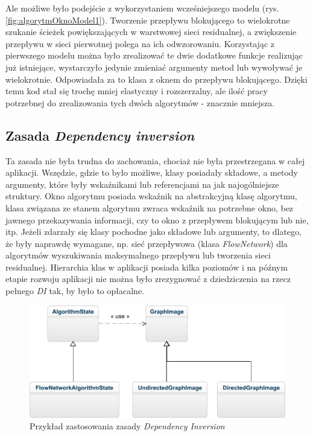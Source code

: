 Ale możliwe było podejście z wykorzystaniem wcześniejszego modelu (rys. \ref{fig:algorytmOknoModel1}). Tworzenie przepływu blokującego to wielokrotne szukanie ścieżek powiększających w warstwowej sieci residualnej, a zwiększenie przepływu w sieci pierwotnej polega na ich odwzorowaniu. Korzystając z pierwszego modelu można było zrealizować te dwie dodatkowe funkcje realizując już istniejące, wystarczyło jedynie zmieniać argumenty metod lub wywoływać je wielokrotnie. Odpowiadała za to klasa z oknem do przepływu blokującego. Dzięki temu kod stał się trochę mniej elastyczny i rozszerzalny, ale ilość pracy potrzebnej do zrealizowania tych dwóch algorytmów - znacznie mniejsza.
\subsection{Zasada \textit{Dependency inversion}}
Ta zasada nie była trudna do zachowania, chociaż nie była przestrzegana w całej aplikacji. Wszędzie, gdzie to było możliwe, klasy posiadały składowe, a metody argumenty, które były wskaźnikami lub referencjami na jak najogólniejsze struktury. Okno algorytmu posiada wskaźnik na abstrakcyjną klasę algorytmu, klasa związana ze stanem algorytmu zwraca wskaźnik na potrzebne okno, bez jawnego przekazywania informacji, czy to okno z przepływem blokującym lub nie, itp. Jeżeli zdarzały się klasy pochodne jako składowe lub argumenty, to dlatego, że były naprawdę wymagane, np. sieć przepływowa (klasa \emph{FlowNetwork}) dla algorytmów wyszukiwania maksymalnego przepływu lub tworzenia sieci residualnej. Hierarchia klas w aplikacji posiada kilka poziomów i na późnym etapie rozwoju aplikacji nie można było zrezygnować z dziedziczenia na rzecz pełnego \emph{DI} tak, by było to opłacalne.
\begin{figure}[H]
	\centering
	\includegraphics[width=0.8\linewidth]{./img/SOLD_DI.pdf}
	\caption{Przykład zastosowania zasady \textit{Dependency Inversion}}
	\label{fig:SOLD_DI}
\end{figure}
